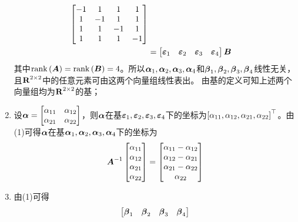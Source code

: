 \documentclass{beamer}
\begin{document}
\begin{frame}[allowframebreaks]
\begin{enumerate}
{\begin{align*}
                  \begin{bmatrix}
                      -1 & 1  & 1  & 1  \\
                      1  & -1 & 1  & 1  \\
                      1  & 1  & -1 & 1  \\
                      1  & 1  & 1  & -1
                  \end{bmatrix}                                                                \\
                   & =\begin{bmatrix}\boldsymbol{\varepsilon}_1&\boldsymbol{\varepsilon}_2&\boldsymbol{\varepsilon}_3&\boldsymbol{\varepsilon}_4\end{bmatrix}\boldsymbol{B}
              \end{align*}
              其中\(\mathrm{rank}\left( \boldsymbol{A} \right)=\mathrm{rank}\left( \boldsymbol{B} \right)=4\)。所以\(\boldsymbol{\alpha}_1,\boldsymbol{\alpha}_2,\boldsymbol{\alpha}_3,\boldsymbol{\alpha}_4\)和\(\boldsymbol{\beta}_1,\boldsymbol{\beta}_2,\boldsymbol{\beta}_3,\boldsymbol{\beta}_4\)线性无关，且\(\boldsymbol{\mathrm{R}}^{2\times2}\)中的任意元素可由这两个向量组线性表出。
              由基的定义可知上述两个向量组均为\(\boldsymbol{\mathrm{R}}^{2\times2}\)的基；
              }
        \item {
              设\(\boldsymbol{\alpha}=\begin{bmatrix}\alpha_{11}&\alpha_{12}\\\alpha_{21}&\alpha_{22}\end{bmatrix}\)，则\(\boldsymbol{\alpha}\)在基\(\boldsymbol{\varepsilon}_1,\boldsymbol{\varepsilon}_2,\boldsymbol{\varepsilon}_3,\boldsymbol{\varepsilon}_4\)下的坐标为\(\left[ \alpha_{11},\alpha_{12},\alpha_{21},\alpha_{22} \right]^\top\)。由(1)可得\(\boldsymbol{\alpha}\)在基\(\boldsymbol{\alpha}_1,\boldsymbol{\alpha}_2,\boldsymbol{\alpha}_3,\boldsymbol{\alpha}_4\)下的坐标为
              \begin{equation*}
                  {\boldsymbol{A}}^{-1}\begin{bmatrix}\alpha_{11}\\\alpha_{12}\\\alpha_{21}\\\alpha_{22}\end{bmatrix}=
                  \begin{bmatrix}\alpha_{11}-\alpha_{12}\\\alpha_{12}-\alpha_{21}\\\alpha_{21}-\alpha_{22}\\\alpha_{22}\end{bmatrix}
              \end{equation*}
              }
        \item {
              由(1)可得
              \begin{align*}
                  \begin{bmatrix}\vecbeta_1&\vecbeta_2&\vecbeta_3&\vecbeta_4\end{bmatrix}

\end{align*}}
\end{enumerate}
\end{frame}
\end{document}
